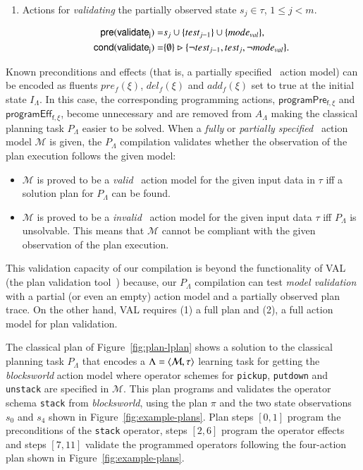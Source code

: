 \begin{itemize}
\begin{enumerate}
\item Actions for {\em validating} the partially observed state $s_j\in\tau$, {\tt\small $1\leq j< m$}.
\begin{small}
\begin{align*}
\hspace*{7pt}\mathsf{pre}(\mathsf{validate_{j}})=&s_j\cup\{test_{j-1}\}\cup \{mode_{val}\},\\
\mathsf{cond}(\mathsf{validate_{j}})=&\{\emptyset\}\rhd\{\neg test_{j-1}, test_j,\neg mode_{val}\}.
\end{align*}
\end{small}
\end{enumerate}
\end{itemize}

Known preconditions and effects (that is, a partially specified \strips\ action model) can be encoded as fluents $pre_f(\xi)$, $del_f(\xi)$ and $add_f(\xi)$ set to true at the initial state $I_{\Lambda}$. In this case, the corresponding programming actions, $\mathsf{programPre_{f,\xi}}$ and $\mathsf{programEff_{f,\xi}}$, become unnecessary and are removed from $A_{\Lambda}$ making the classical planning task $P_{\Lambda}$ easier to be solved. When a {\em fully} or {\em partially specified} \strips\ action model $\mathcal{M}$ is given, the $P_{\Lambda}$ compilation validates whether the observation of the plan execution follows the given model:
\begin{itemize}
\item $\mathcal{M}$ is proved to be a {\em valid} \strips\ action model for the given input data in $\tau$ iff a solution plan for $P_{\Lambda}$ can be found.
\item $\mathcal{M}$ is proved to be a {\em invalid} \strips\ action model for the given input data $\tau$ iff $P_{\Lambda}$ is unsolvable. This means that $\mathcal{M}$ cannot be compliant with the given observation of the plan execution.
\end{itemize}
This validation capacity of our compilation is beyond the functionality of VAL (the plan validation tool~\cite{howey2004val}) because, our $P_{\Lambda}$ compilation can test {\em model validation} with a partial (or even an empty) action model and a partially observed plan trace. On the other hand, VAL requires (1) a full plan and (2), a full action model for plan validation.

The classical plan of Figure~\ref{fig:plan-lplan} shows a solution to the classical planning task $P_{\Lambda}$ that encodes a $\Lambda={\langle \mathcal{M},\tau \rangle}$ learning task for getting the {\em blocksworld} action model where operator schemes for {\tt\small pickup}, {\tt\small putdown} and {\tt\small unstack} are specified in $\mathcal{M}$. This plan programs and validates the operator schema {\tt\small stack} from {\em blocksworld}, using the plan $\pi$ and the two state observations $s_0$ and $s_4$ shown in Figure~\ref{fig:example-plans}. Plan steps $[0,1]$ program the preconditions of the {\tt\small stack} operator, steps $[2,6]$ program the operator effects and steps $[7,11]$ validate the programmed operators following the four-action plan shown in Figure~\ref{fig:example-plans}.

